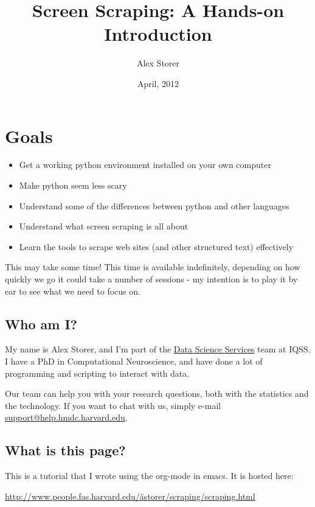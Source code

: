 \documentclass[11pt]{article}
\title{Screen Scraping: A Hands-on Introduction}
\author{Alex Storer}
\date{April, 2012}
\begin{document}
\maketitle

\setcounter{tocdepth}{3}
\tableofcontents
\vspace*{1cm}




\section{Goals}
\label{sec-1}

\begin{itemize}
\item Get a working python environment installed on your own computer
\item Make python seem less scary
\item Understand some of the differences between python and other languages
\item Understand what screen scraping is all about
\item Learn the tools to scrape web sites (and other structured text)
  effectively
\end{itemize}

This may take some time!  This time is available indefinitely,
depending on how quickly we go it could take a number of sessions -
my intention is to play it by ear to see what we need to focus on.
\subsection{Who am I?}
\label{sec-1-1}


My name is Alex Storer, and I'm part of the \href{http://dss.iq.harvard.edu}{Data Science Services} team at IQSS.  I have a PhD in Computational Neuroscience,
and have done a lot of programming and scripting to interact with
data.

Our team can help you with your research questions, both with the
statistics and the technology.  If you want to chat with us, simply
e-mail \hyperref[support-help.hmdc.harvard.edu]{support@help.hmdc.harvard.edu}.
\subsection{What is this page?}
\label{sec-1-2}


This is a tutorial that I wrote using the org-mode in emacs.  It is
hosted here:

\href{http://www.people.fas.harvard.edu/~astorer/scraping/scraping.html}{http://www.people.fas.harvard.edu/\~astorer/scraping/scraping.html}
\end{document}
